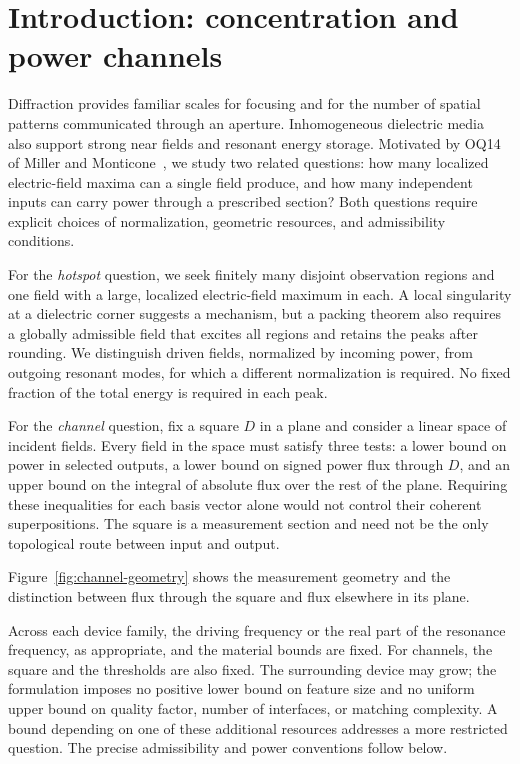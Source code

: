 \section{Introduction: concentration and power channels}\label{pr:section}

Diffraction provides familiar scales for focusing and for the number of
spatial patterns communicated through an aperture. Inhomogeneous dielectric
media also support strong near fields and resonant energy storage. Motivated
by OQ14 of Miller and Monticone~\cite[Section 5.6]{millerMonticone2026},
we study two related questions: how many localized electric-field maxima
can a single field produce, and how many independent inputs can carry power
through a prescribed section? Both questions require explicit choices of
normalization, geometric resources, and admissibility conditions.

For the \emph{hotspot} question, we seek finitely many disjoint observation
regions and one field with a large, localized electric-field maximum in each.
A local singularity at a dielectric corner suggests a mechanism,
but a packing theorem also requires a globally admissible field that excites
all regions and retains the peaks after rounding. We distinguish driven
fields, normalized by incoming power, from outgoing resonant modes, for
which a different normalization is required. No fixed fraction of the
total energy is required in each peak.

For the \emph{channel} question, fix a square $D$ in a plane and consider
a linear space of incident fields. Every field in the space must satisfy
three tests: a lower bound on power in selected outputs, a lower bound on
signed power flux through $D$, and an upper bound on the integral of absolute
flux over the rest of the plane. Requiring these inequalities for each basis
vector alone would not control their coherent superpositions. The square is
a measurement section and need not be the only topological route between
input and output.

Figure~\ref{fig:channel-geometry} shows the measurement geometry and the
distinction between flux through the square and flux elsewhere in its plane.


Across each device family, the driving frequency or the real part of the
resonance frequency, as appropriate, and the material bounds are fixed.
For channels, the square and the thresholds are also fixed. The surrounding
device may grow; the formulation imposes no
positive lower bound on feature size and no uniform upper bound on quality
factor, number of interfaces, or matching complexity. A bound depending on
one of these additional resources addresses a more restricted question.
The precise admissibility and power conventions follow below.

